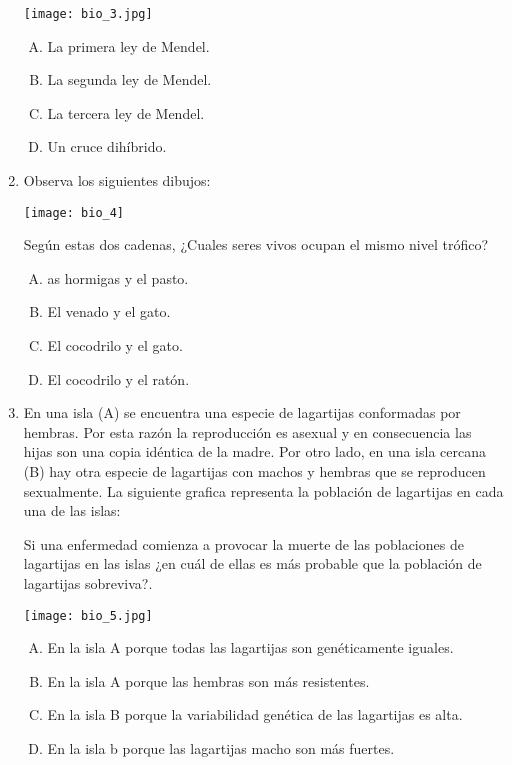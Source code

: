 \begin{enumerate}
\begin{center}
\texttt{[image: bio\_3.jpg]} 
\end{center}
\begin{enumerate}[(A)]
\item La primera ley de Mendel.
\item La segunda ley de Mendel.
\item La tercera ley de Mendel.
\item Un cruce dihíbrido.
\end{enumerate}

\item Observa los siguientes dibujos: \label{bio-5}

\begin{center}
\texttt{[image: bio\_4]} 
\end{center}

Según estas dos cadenas, ¿Cuales seres vivos ocupan el mismo nivel trófico?

\begin{enumerate}[(A)]
\item  as hormigas y el pasto.
\item El venado y el gato.
\item El cocodrilo y el gato.
\item El cocodrilo y el ratón.
\end{enumerate}


\newpage
\item En una isla (A) se encuentra una especie de lagartijas conformadas por hembras. Por esta razón la reproducción es asexual y en consecuencia las hijas son una copia idéntica de la madre.  Por otro lado, en una isla cercana (B) hay otra especie de lagartijas con machos y hembras que se reproducen sexualmente.  La siguiente grafica representa la población de lagartijas en cada una de las islas:\label{bio-6}

Si una enfermedad comienza a provocar la muerte de las poblaciones de lagartijas en las islas ¿en cuál de ellas es más  probable que la población de lagartijas sobreviva?.


\begin{center}
\texttt{[image: bio\_5.jpg]} 
\end{center}
\begin{enumerate}[(A)]
\item En la isla A porque todas las lagartijas son genéticamente iguales.
\item En la isla A porque las hembras son más resistentes.
\item En la isla B porque la variabilidad genética de las lagartijas es alta. 
\item En la isla b porque las lagartijas macho son m\'as fuertes.
\end{enumerate}


\end{enumerate}
